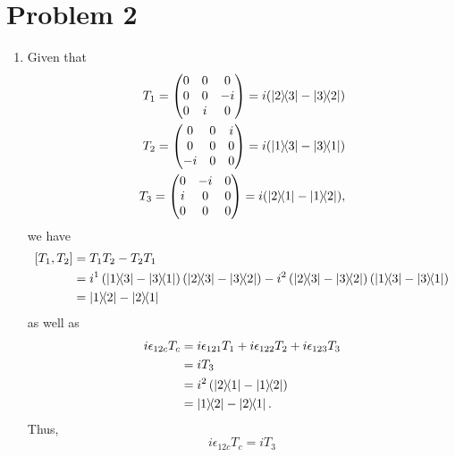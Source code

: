 \documentclass[12pt]{article}
\begin{document}
\section*{Problem 2}
\begin{enumerate}[label=(\alph*)]
    \item Given that
    \begin{align*}
        T_1 = \mqty(0&0&0\\0&0&-i\\0&i&0) = i(\dyad{2}{3} - \dyad{3}{2}) \\
        T_2 = \mqty(0&0&i\\0&0&0\\-i&0&0) = i(\dyad{1}{3} - \dyad{3}{1}) \\
        T_3 = \mqty(0&-i&0\\i&0&0\\0&0&0) = i(\dyad{2}{1} - \dyad{1}{2}),
    \end{align*}
    we have
    \begin{align*}
        \comm{T_1}{T_2} &= T_1T_2 - T_2T_1 \\
        &= i^1\left(\dyad{1}{3} - \dyad{3}{1}\right)\left(\dyad{2}{3}-\dyad{3}{2}\right) - i^2\left(\dyad{2}{3} - \dyad{3}{2}\right)\left(\dyad{1}{3} - \dyad{3}{1}\right) \\
        &= \dyad{1}{2} - \dyad{2}{1}
    \end{align*}
    as well as
    \begin{align*}
        i\epsilon_{12c}T_c &= i\epsilon_{121}T_1 + i\epsilon_{122}T_2 + i\epsilon_{123}T_3 \\
        &= iT_3 \\
        &= i^2\left(\dyad{2}{1} - \dyad{1}{2}\right) \\
        &= \dyad{1}{2} - \dyad{2}{1}.
    \end{align*}
    Thus,
    \[ \boxed{i\epsilon_{12c}T_c = iT_3} \]


\end{enumerate}
\end{document}
